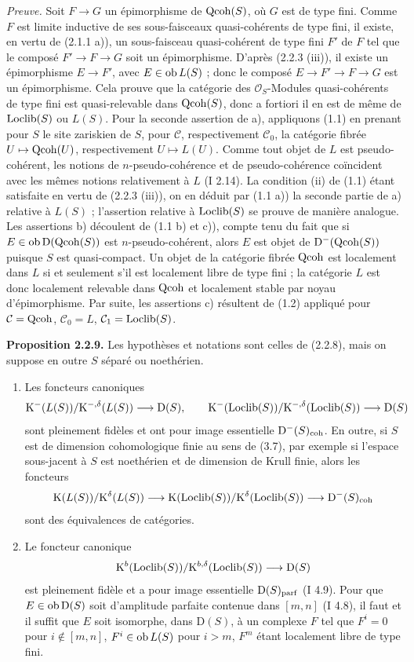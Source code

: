 \documentclass[11pt]{article}
\begin{document}
\emph{Preuve.} Soit $F\to G$ un épimorphisme de $\operatorname{Qcoh}(S)$, où $G$ est de type fini. Comme $F$ est limite inductive de ses sous-faisceaux quasi-cohérents de type fini, il existe, en vertu de (2.1.1 a)), un sous-faisceau quasi-cohérent de type fini $F'$ de $F$ tel que le composé $F'\to F\to G$ soit un épimorphisme. D'après (2.2.3 (iii)), il existe un épimorphisme $E\to F'$, avec $E\in\operatorname{ob} L(S)$ ; donc le composé $E\to F'\to F\to G$ est un épimorphisme. Cela prouve que la catégorie des $\mathcal O_S$-Modules quasi-cohérents de type fini est quasi-relevable dans $\operatorname{Qcoh}(S)$, donc a fortiori il en est de même de $\operatorname{Loclib}(S)$ ou $L(S)$. Pour la seconde assertion de a), appliquons (1.1) en prenant pour $S$ le site zariskien de $S$, pour $\mathcal C$, respectivement $\mathcal C_0$, la catégorie fibrée $U\mapsto\operatorname{Qcoh}(U)$, respectivement $U\mapsto L(U)$. Comme tout objet de $L$ est pseudo-cohérent, les notions de $n$-pseudo-cohérence et de pseudo-cohérence coïncident avec les mêmes notions relativement à $L$ (I 2.14). La condition (ii) de (1.1) étant satisfaite en vertu de (2.2.3 (iii)), on en déduit par (1.1 a)) la seconde partie de a) relative à $L(S)$ ; l'assertion relative à $\operatorname{Loclib}(S)$ se prouve de manière analogue. Les assertions b) découlent de (1.1 b) et c)), compte tenu du fait que si $E\in\operatorname{ob}\mathrm D(\operatorname{Qcoh}(S))$ est $n$-pseudo-cohérent, alors $E$ est objet de $\mathrm D^{-}(\operatorname{Qcoh}(S))$ puisque $S$ est quasi-compact. Un objet de la catégorie fibrée $\operatorname{Qcoh}$ est localement dans $L$ si et seulement s'il est localement libre de type fini ; la catégorie $L$ est donc localement relevable dans $\operatorname{Qcoh}$ et localement stable par noyau d'épimorphisme. Par suite, les assertions c) résultent de (1.2) appliqué pour $\mathcal C=\operatorname{Qcoh}$, $\mathcal C_0=L$, $\mathcal C_1=\operatorname{Loclib}(S)$.

\textbf{Proposition 2.2.9.} Les hypothèses et notations sont celles de (2.2.8), mais on suppose en outre $S$ séparé ou noethérien.
\begin{enumerate}[label=\alph*)]
\item Les foncteurs canoniques
\[
\mathrm K^{-}(L(S))/\mathrm K^{-,\delta}(L(S))\longrightarrow\mathrm D(S),
\qquad
\mathrm K^{-}(\operatorname{Loclib}(S))/\mathrm K^{-,\delta}(\operatorname{Loclib}(S))\longrightarrow\mathrm D(S)
\]
sont pleinement fidèles et ont pour image essentielle $\mathrm D^{-}(S)_{\operatorname{coh}}$. En outre, si $S$ est de dimension cohomologique finie au sens de (3.7), par exemple si l'espace sous-jacent à $S$ est noethérien et de dimension de Krull finie, alors les foncteurs
\[
\mathrm K(L(S))/\mathrm K^{\delta}(L(S))\longrightarrow
\mathrm K(\operatorname{Loclib}(S))/\mathrm K^{\delta}(\operatorname{Loclib}(S))\longrightarrow
\mathrm D^{-}(S)_{\operatorname{coh}}
\]
sont des équivalences de catégories.
\item Le foncteur canonique
\[
\mathrm K^b(\operatorname{Loclib}(S))/\mathrm K^{b,\delta}(\operatorname{Loclib}(S))\longrightarrow\mathrm D(S)
\]
est pleinement fidèle et a pour image essentielle $\mathrm D(S)_{\operatorname{parf}}$ (I 4.9). Pour que $E\in\operatorname{ob}\mathrm D(S)$ soit d'amplitude parfaite contenue dans $[m,n]$ (I 4.8), il faut et il suffit que $E$ soit isomorphe, dans $\mathrm D(S)$, à un complexe $F$ tel que $F^i=0$ pour $i\notin[m,n]$, $F^i\in\operatorname{ob} L(S)$ pour $i>m$, $F^m$ étant localement libre de type fini.
\end{enumerate}
\end{document}
